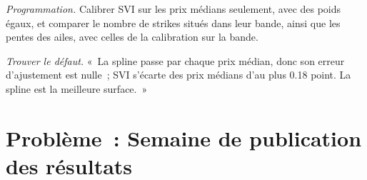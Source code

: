 \begin{exercise}[$\star\star\star$]\label{exo:dv:parametrising-the-surface:7}
\emph{Programmation.} Calibrer SVI sur les prix médians seulement, avec des poids égaux, et comparer le nombre de strikes situés
dans leur bande, ainsi que les pentes des ailes, avec celles de la calibration sur la bande.
\end{exercise}

\begin{exercise}[$\star\star\star$]\label{exo:dv:parametrising-the-surface:8}
\emph{Trouver le défaut.} «~La spline passe par chaque prix médian, donc son erreur d'ajustement est nulle~; SVI
s'écarte des prix médians d'au plus 0.18 point. La spline est la meilleure surface.~»
\end{exercise}

\section{Problème~: Semaine de publication des résultats}

